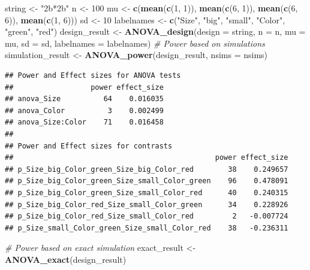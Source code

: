 \documentclass[]{book}
\newenvironment{Shaded}{\begin{snugshade}}{\end{snugshade}}
\newcommand{\CommentTok}[1]{\textcolor[rgb]{0.56,0.35,0.01}{\textit{#1}}}
\newcommand{\DataTypeTok}[1]{\textcolor[rgb]{0.13,0.29,0.53}{#1}}
\newcommand{\DecValTok}[1]{\textcolor[rgb]{0.00,0.00,0.81}{#1}}
\newcommand{\KeywordTok}[1]{\textcolor[rgb]{0.13,0.29,0.53}{\textbf{#1}}}
\newcommand{\NormalTok}[1]{#1}
\newcommand{\StringTok}[1]{\textcolor[rgb]{0.31,0.60,0.02}{#1}}
\begin{document}
\begin{Shaded}
\begin{Highlighting}[]
\NormalTok{string <-}\StringTok{ "2b*2b"}
\NormalTok{n <-}\StringTok{ }\DecValTok{100}
\NormalTok{mu <-}\StringTok{ }\KeywordTok{c}\NormalTok{(}\KeywordTok{mean}\NormalTok{(}\KeywordTok{c}\NormalTok{(}\DecValTok{1}\NormalTok{, }\DecValTok{1}\NormalTok{)), }\KeywordTok{mean}\NormalTok{(}\KeywordTok{c}\NormalTok{(}\DecValTok{6}\NormalTok{, }\DecValTok{1}\NormalTok{)), }\KeywordTok{mean}\NormalTok{(}\KeywordTok{c}\NormalTok{(}\DecValTok{6}\NormalTok{, }\DecValTok{6}\NormalTok{)), }\KeywordTok{mean}\NormalTok{(}\KeywordTok{c}\NormalTok{(}\DecValTok{1}\NormalTok{, }\DecValTok{6}\NormalTok{)))}
\NormalTok{sd <-}\StringTok{ }\DecValTok{10}
\NormalTok{labelnames <-}\StringTok{ }\KeywordTok{c}\NormalTok{(}\StringTok{"Size"}\NormalTok{, }\StringTok{"big"}\NormalTok{, }\StringTok{"small"}\NormalTok{, }\StringTok{"Color"}\NormalTok{, }\StringTok{"green"}\NormalTok{, }\StringTok{"red"}\NormalTok{)}
\NormalTok{design_result <-}\StringTok{ }\KeywordTok{ANOVA_design}\NormalTok{(}\DataTypeTok{design =}\NormalTok{ string,}
                   \DataTypeTok{n =}\NormalTok{ n, }
                   \DataTypeTok{mu =}\NormalTok{ mu, }
                   \DataTypeTok{sd =}\NormalTok{ sd, }
                   \DataTypeTok{labelnames =}\NormalTok{ labelnames)}
\CommentTok{# Power based on simulations}
\NormalTok{simulation_result <-}\StringTok{ }\KeywordTok{ANOVA_power}\NormalTok{(design_result, }\DataTypeTok{nsims =}\NormalTok{ nsims)}
\end{Highlighting}
\end{Shaded}

\begin{verbatim}
## Power and Effect sizes for ANOVA tests
##                  power effect_size
## anova_Size          64    0.016035
## anova_Color          3    0.002499
## anova_Size:Color    71    0.016458
## 
## Power and Effect sizes for contrasts
##                                               power effect_size
## p_Size_big_Color_green_Size_big_Color_red        38    0.249657
## p_Size_big_Color_green_Size_small_Color_green    96    0.478091
## p_Size_big_Color_green_Size_small_Color_red      40    0.240315
## p_Size_big_Color_red_Size_small_Color_green      34    0.228926
## p_Size_big_Color_red_Size_small_Color_red         2   -0.007724
## p_Size_small_Color_green_Size_small_Color_red    38   -0.236311
\end{verbatim}

\begin{Shaded}
\begin{Highlighting}[]
\CommentTok{# Power based on exact simulation}
\NormalTok{exact_result <-}\StringTok{ }\KeywordTok{ANOVA_exact}\NormalTok{(design_result)}
\end{Highlighting}
\end{Shaded}
\end{document}
